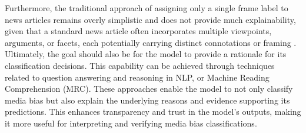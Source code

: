 Furthermore, the traditional approach of assigning only a single frame label to news articles remains overly simplistic and does not provide much explainability, given that a standard news article often incorporates multiple viewpoints, arguments, or facets, each potentially carrying distinct connotations or framing \cite{vallejo-2023-connecting}. Ultimately, the goal should also be for the model to provide a rationale for its classification decisions. This capability can be achieved through techniques related to question answering and reasoning in NLP, or Machine Reading Comprehension (MRC). These approaches enable the model to not only classify media bias but also explain the underlying reasons and evidence supporting its predictions. This enhances transparency and trust in the model's outputs, making it more useful for interpreting and verifying media bias classifications.




